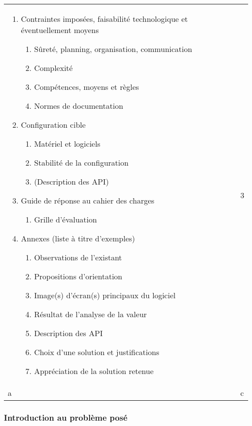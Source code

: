 \begin{tabular}{p{} p{0.5cm} p{}}
{\begin{enumerate}
      \item Contraintes imposées, faisabilité technologique et éventuellement moyens
        \begin{enumerate}
          \item Sûreté, planning, organisation, communication
          \item Complexité 
          \item Compétences, moyens et règles
          \item Normes de documentation
        \end{enumerate} 
      \item  Configuration cible
        \begin{enumerate}
          \item Matériel et logiciels
          \item Stabilité de la configuration
          \item (Description des API)
        \end{enumerate} 
      \item  Guide de réponse au cahier des charges
        \begin{enumerate}
          \item Grille d'évaluation
        \end{enumerate} 
      \item  Annexes (liste à titre d'exemples)
        \begin{enumerate}
          \item Observations de l'existant
          \item Propositions d'orientation
          \item Image(s) d'écran(s) principaux du logiciel
          \item Résultat de l'analyse de la valeur
          \item Description des API
          \item Choix d'une solution et justifications
          \item Appréciation de la solution retenue 
        \end{enumerate}         
        
      \end{enumerate}
      }
   &  & 3 \\
   a &  & c
\end{tabular}
   
\subsubsection{Introduction au problème posé}


